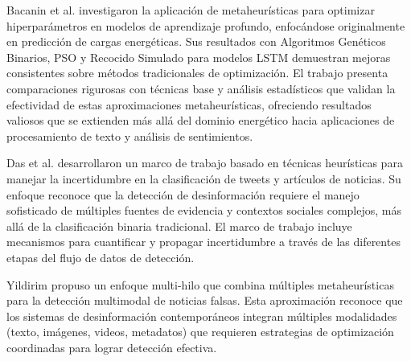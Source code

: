 Bacanin et al. \cite{bacanin2023benefits} investigaron la aplicación de metaheurísticas para optimizar hiperparámetros en modelos de aprendizaje profundo, enfocándose originalmente en predicción de cargas energéticas. Sus resultados con Algoritmos Genéticos Binarios, PSO y Recocido Simulado para modelos LSTM demuestran mejoras consistentes sobre métodos tradicionales de optimización. El trabajo presenta comparaciones rigurosas con técnicas base y análisis estadísticos que validan la efectividad de estas aproximaciones metaheurísticas, ofreciendo resultados valiosos que se extienden más allá del dominio energético hacia aplicaciones de procesamiento de texto y análisis de sentimientos.

Das et al. \cite{das2022heuristic} desarrollaron un marco de trabajo basado en técnicas heurísticas para manejar la incertidumbre en la clasificación de tweets y artículos de noticias. Su enfoque reconoce que la detección de desinformación requiere el manejo sofisticado de múltiples fuentes de evidencia y contextos sociales complejos, más allá de la clasificación binaria tradicional. El marco de trabajo incluye mecanismos para cuantificar y propagar incertidumbre a través de las diferentes etapas del flujo de datos de detección.

Yildirim \cite{yildirim2023novel} propuso un enfoque multi-hilo que combina múltiples metaheurísticas para la detección multimodal de noticias falsas. Esta aproximación reconoce que los sistemas de desinformación contemporáneos integran múltiples modalidades (texto, imágenes, videos, metadatos) que requieren estrategias de optimización coordinadas para lograr detección efectiva.

